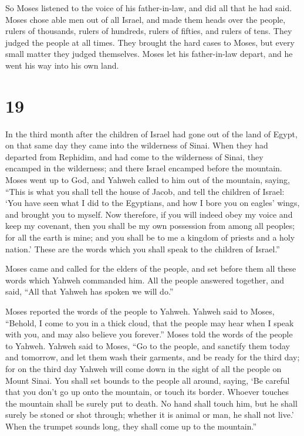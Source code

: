  So Moses listened to the voice of his father-in-law, and
did all that he had said.  Moses chose able men out of all
Israel, and made them heads over the people, rulers of thousands, rulers
of hundreds, rulers of fifties, and rulers of tens.  They
judged the people at all times. They brought the hard cases to Moses,
but every small matter they judged themselves.  Moses let
his father-in-law depart, and he went his way into his own land.

\hypertarget{section-18}{%
\section{19}\label{section-18}}

 In the third month after the children of Israel had gone
out of the land of Egypt, on that same day they came into the wilderness
of Sinai.  When they had departed from Rephidim, and had
come to the wilderness of Sinai, they encamped in the wilderness; and
there Israel encamped before the mountain.  Moses went up to
God, and Yahweh called to him out of the mountain, saying, ``This is
what you shall tell the house of Jacob, and tell the children of Israel:
 `You have seen what I did to the Egyptians, and how I bore
you on eagles' wings, and brought you to myself.  Now
therefore, if you will indeed obey my voice and keep my covenant, then
you shall be my own possession from among all peoples; for all the earth
is mine;  and you shall be to me a kingdom of priests and a
holy nation.' These are the words which you shall speak to the children
of Israel.''

 Moses came and called for the elders of the people, and set
before them all these words which Yahweh commanded him.  All
the people answered together, and said, ``All that Yahweh has spoken we
will do.''

Moses reported the words of the people to Yahweh.  Yahweh
said to Moses, ``Behold, I come to you in a thick cloud, that the people
may hear when I speak with you, and may also believe you forever.''
Moses told the words of the people to Yahweh.  Yahweh said
to Moses, ``Go to the people, and sanctify them today and tomorrow, and
let them wash their garments,  and be ready for the third
day; for on the third day Yahweh will come down in the sight of all the
people on Mount Sinai.  You shall set bounds to the people
all around, saying, `Be careful that you don't go up onto the mountain,
or touch its border. Whoever touches the mountain shall be surely put to
death.  No hand shall touch him, but he shall surely be
stoned or shot through; whether it is animal or man, he shall not live.'
When the trumpet sounds long, they shall come up to the mountain.''

